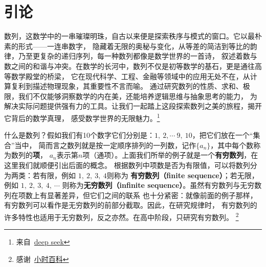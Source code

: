 \documentclass[a5paper]{article}
\begin{document}

\thispagestyle{empty} %
\newpage


\part{\textbf{引论}}

数列，这数学中的一串璀璨明珠，自古以来便是探索秩序与模式的窗口。它以最朴素的形式——一连串数字，
隐藏着无限的奥秘与变化，从等差的简洁到等比的韵律，乃至更复杂的递归序列，每一种数列都像是数学世界的一首诗，
叙述着数与数之间的和谐与冲突。在数学的长河中，数列不仅是初等数学的基石，更是通往高等数学殿堂的桥梁，
它在现代科学、工程、金融等领域中的应用无处不在，从计算复利到描述物理现象，其重要性不言而喻。
通过研究数列的性质、求和、极限，我们不仅能够洞察数学的内在美，还能培养逻辑思维与抽象思考的能力，
为解决实际问题提供强有力的工具。让我们一起踏上这段探索数列之美的旅程，揭开它背后的数学真理，
感受数学世界的无限魅力。\footnote{来自~\href{https://chat.deepseek.com/}{deep seek}}

什么是数列？假如我们有10个数字它们分别是：$1,~2, \cdots~ 9,~10$，把它们放在一个“集合”当中，
简而言之数列就是按一定顺序排列的一列数，记作$\{a_n\}$，其中每个数称为数列的\textbf{项}，
$a_n$表示第$n$项（通项）。上面我们所举的例子就是一个\textbf{有穷数列}，在这里我们就顺便引出后面的概念。
根据数列中项数是否为有限值，可以将数列分为两类：若有限，例如 $1,~2,~3,~4$则称为
\textbf{有穷数列（finite sequence）}；若无限，例如 $1,~2,~3,~4,~\cdots$ 则称为\textbf{无穷数列（infinite sequence）}。虽然有穷数列与无穷数列在项数上有显著差异，但它们之间的联系
也十分紧密：就像前面的例子那样，有穷数列可以看作是无穷数列的前部分截取。因此，在研究规律时，
有穷数列的许多特性也适用于无穷数列，反之亦然。在高中阶段，只研究有穷数列。
\footnote{感谢~\href{https://wuli.wiki/online/HsSeFu.html}{小时百科}}
\end{document}
